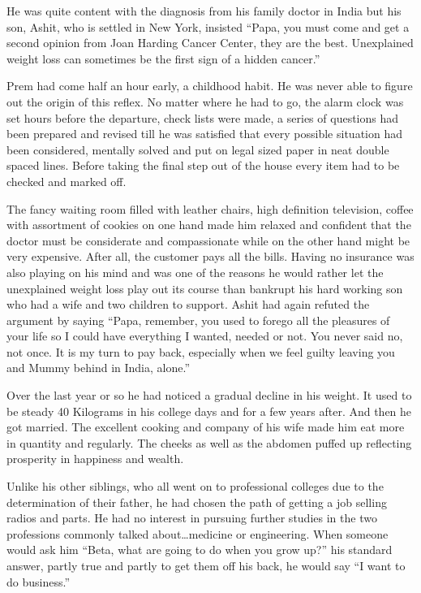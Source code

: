He was quite content with the diagnosis from his family doctor in India
but his son, Ashit, who is settled in New York, insisted ``Papa, you
must come and get a second opinion from Joan Harding Cancer Center, they
are the best. Unexplained weight loss can sometimes be the first sign of
a hidden cancer.''

Prem had come half an hour early, a childhood habit. He was never able
to figure out the origin of this reflex. No matter where he had to go,
the alarm clock was set hours before the departure, check lists were
made, a series of questions had been prepared and revised till he was
satisfied that every possible situation had been considered, mentally
solved and put on legal sized paper in neat double spaced lines. Before
taking the final step out of the house every item had to be checked and
marked off.

The fancy waiting room filled with leather chairs, high definition
television, coffee with assortment of cookies on one hand made him
relaxed and confident that the doctor must be considerate and
compassionate while on the other hand might be very expensive. After
all, the customer pays all the bills. Having no insurance was also
playing on his mind and was one of the reasons he would rather let the
unexplained weight loss play out its course than bankrupt his hard
working son who had a wife and two children to support. Ashit had again
refuted the argument by saying ``Papa, remember, you used to forego all
the pleasures of your life so I could have everything I wanted, needed
or not. You never said no, not once. It is my turn to pay back,
especially when we feel guilty leaving you and Mummy behind in India,
alone.''

Over the last year or so he had noticed a gradual decline in his weight.
It used to be steady 40 Kilograms in his college days and for a few
years after. And then he got married. The excellent cooking and company
of his wife made him eat more in quantity and regularly. The cheeks as
well as the abdomen puffed up reflecting prosperity in happiness and
wealth.

Unlike his other siblings, who all went on to professional colleges due
to the determination of their father, he had chosen the path of getting
a job selling radios and parts. He had no interest in pursuing further
studies in the two professions commonly talked about\ldots{}medicine or
engineering. When someone would ask him ``Beta, what are going to do
when you grow up?'' his standard answer, partly true and partly to get
them off his back, he would say ``I want to do business.''


